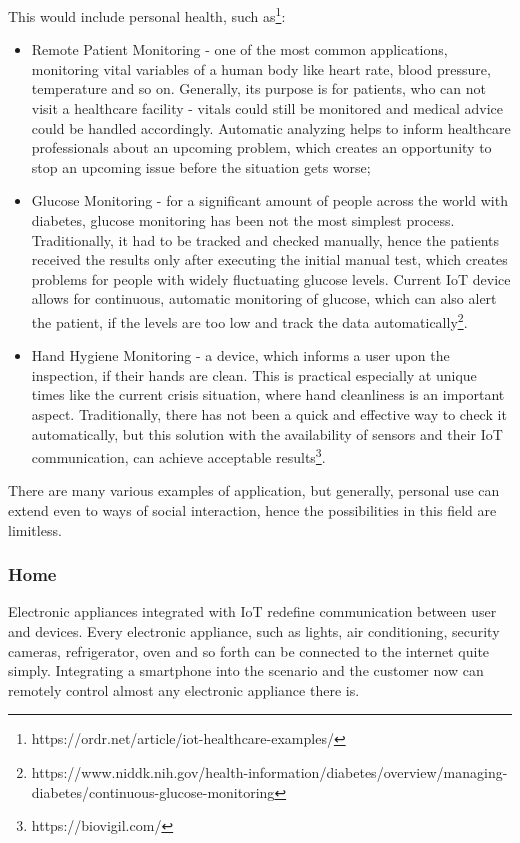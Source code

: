 \documentclass[conference]{IEEEtran}
\begin{document}
This would include personal health, such as\footnote{https://ordr.net/article/iot-healthcare-examples/}:
\begin{itemize}
    \item Remote Patient Monitoring - one of the most common applications, monitoring vital variables of a human body like heart rate, blood pressure, temperature and so on. Generally, its purpose is for patients, who can not visit a healthcare facility - vitals could still be monitored and medical advice could be handled accordingly. Automatic analyzing helps to inform healthcare professionals about an upcoming problem, which creates an opportunity to stop an upcoming issue before the situation gets worse;
    \item Glucose Monitoring - for a significant amount of people across the world with diabetes, glucose monitoring has been not the most simplest process. Traditionally, it had to be tracked and checked manually, hence the patients received the results only after executing the initial manual test, which creates problems for people with widely fluctuating glucose levels. Current IoT device allows for continuous, automatic monitoring of glucose, which can also alert the patient, if the levels are too low and track the data automatically\footnote{https://www.niddk.nih.gov/health-information/diabetes/overview/managing-diabetes/continuous-glucose-monitoring}.
    \item Hand Hygiene Monitoring - a device, which informs a user upon the inspection, if their hands are clean. This is practical especially at unique times like the current crisis situation, where hand cleanliness is an important aspect. Traditionally, there has not been a quick and effective way to check it automatically, but this solution with the availability of sensors and their IoT communication, can achieve acceptable results\footnote{https://biovigil.com/}.
\end{itemize}

There are many various examples of application, but generally, personal use can extend even to ways of social interaction, hence the possibilities in this field are limitless.

\subsubsection{Home}

Electronic appliances integrated with IoT redefine communication between user and devices. Every electronic appliance, such as lights, air conditioning, security cameras, refrigerator, oven and so forth can be connected to the internet quite simply. Integrating a smartphone into the scenario and the customer now can remotely control almost any electronic appliance there is. 
\end{document}
